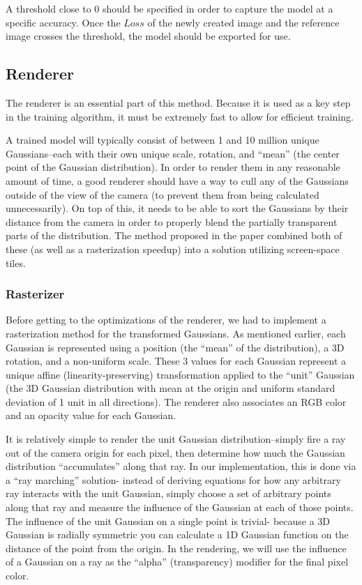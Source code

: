 \documentclass[12pt, a4paper, twocolumn]{article}
\begin{document}
A threshold close to $0$ should be specified in order to capture the model at a specific accuracy. Once the $Loss$ of the newly created image and the reference image crosses the threshold, the model should be exported for use.

\subsection{Renderer}

The renderer is an essential part of this method. Because it is used as a key step in the training algorithm, it must be extremely fast to allow for efficient training. 

A trained model will typically consist of between 1 and 10 million unique Gaussians--each with their own unique scale, rotation, and ``mean'' (the center point of the Gaussian distribution). In order to render them in any reasonable amount of time, a good renderer should have a way to cull any of the Gaussians outside of the view of the camera (to prevent them from being calculated unnecessarily). On top of this, it needs to be able to sort the Gaussians by their distance from the camera in order to properly blend the partially transparent parts of the distribution. The method proposed in the paper combined both of these (as well as a rasterization speedup) into a solution utilizing screen-space tiles. 

\subsubsection{Rasterizer}

Before getting to the optimizations of the renderer, we had to implement a rasterization method for the transformed Gaussians. As mentioned earlier, each Gaussian is represented using a position (the ``mean'' of the distribution), a 3D rotation, and a non-uniform scale. These 3 values for each Gaussian represent a unique affine (linearity-preserving) transformation applied to the ``unit'' Gaussian (the 3D Gaussian distribution with mean at the origin and uniform standard deviation of 1 unit in all directions). The renderer also associates an RGB color and an opacity value for each Gaussian. 

It is relatively simple to render the unit Gaussian distribution--simply fire a ray out of the camera origin for each pixel, then determine how much the Gaussian distribution ``accumulates'' along that ray. In our implementation, this is done via a ``ray marching'' solution- instead of deriving equations for how any arbitrary ray interacts with the unit Gaussian, simply choose a set of arbitrary points along that ray and measure the influence of the Gaussian at each of those points. The influence of the unit Gaussian on a single point is trivial- because a 3D Gaussian is radially symmetric you can calculate a 1D Gaussian function on the distance of the point from the origin. In the rendering, we will use the influence of a Gaussian on a ray as the ``alpha'' (transparency) modifier for the final pixel color.
\end{document}
